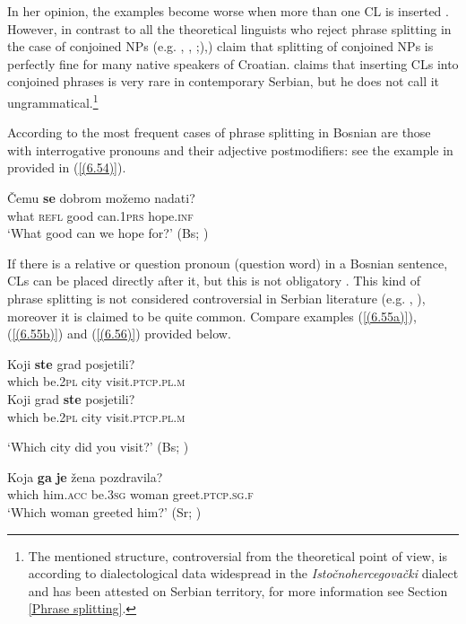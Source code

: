 \noindent In her opinion, the examples become worse when more than one CL is inserted \citep[cf.][419]{Progovac96}. However, in contrast to all the theoretical linguists who reject phrase splitting in the case of conjoined NPs (e.g. \citealt[116f]{RadanovicKocic88}, \citealt[66ff]{Schutze94}, \citealt[418f]{Progovac96};),\citealt[5, 11]{FranksPeti06}) claim that splitting of conjoined NPs is perfectly fine for many native speakers of Croatian. \citet[320]{Popovic04} claims that inserting CLs into conjoined phrases is very rare in contemporary Serbian, but he does not call it ungrammatical.\footnote{The mentioned structure, controversial from the theoretical point of view, is according to dialectological data widespread in the \textit{Istočnohercegovački} dialect and has been attested on Serbian territory, for more information see Section \ref{Phrase splitting}.}

According to \citet[458]{Ridjanovic12} the most frequent cases of phrase splitting in Bosnian are those with interrogative pronouns and their adjective postmodifiers: see the example in provided in (\ref{(6.54)}).

\begin{exe}\ex\label{(6.54)}
\gll Čemu \textbf{se} dobrom možemo nadati?\\
 what \textsc{refl} good can\textsc{.1prs} hope\textsc{.inf} \\
\glt ‘What good can we hope for?’ 
\hfill (Bs; \citealt[458]{Ridjanovic12})
\end{exe}

\noindent If there is a relative or question pronoun (question word) in a Bosnian sentence, CLs can be placed directly after it, but this is not obligatory \citep[563]{Ridjanovic12}. This kind of phrase splitting is not considered controversial in Serbian literature (e.g. \citealt[307]{Pesikan58}, \citealt[294]{Popovic04}), moreover it is claimed to be quite common. Compare examples (\ref{(6.55a)}), (\ref{(6.55b)}) and (\ref{(6.56)}) provided below.

\begin{exe}\ex\begin{xlist}\ex\label{(6.55a)}
\gll Koji \textbf{ste} grad posjetili? \\
 which be\textsc{.2pl} city visit\textsc{.ptcp.pl.m} \\
\ex\label{(6.55b)}
\gll Koji grad \textbf{ste} posjetili? \\
 which be\textsc{.2pl} city visit\textsc{.ptcp.pl.m} \\
\end{xlist}
\glt ‘Which city did you visit?’ 
\hfill  (Bs; \citealt[563]{Ridjanovic12})

\ex\label{(6.56)}
\gll Koja \textbf{ga} \textbf{je} žena pozdravila? \\
 which him\textsc{.acc} be\textsc{.3sg} woman greet\textsc{.ptcp.sg.f} \\
\glt ‘Which woman greeted him?’ 
\hfill (Sr; \citealt[307]{Pesikan58})
\end{exe}

